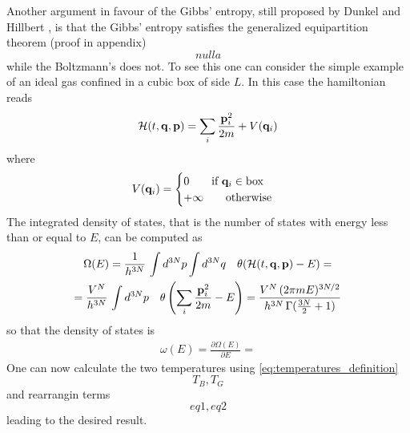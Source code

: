 Another argument in favour of the Gibbs' entropy, still proposed by Dunkel and Hillbert \cite{Dunkel_Hillbert}, is that the Gibbs' entropy satisfies the generalized equipartition theorem (proof in appendix)
\begin{equation}
    nulla
    \label{eq:equipartition}
\end{equation}
while the Boltzmann's does not. To see this one can consider the simple example of an ideal gas confined in a cubic box of side $L$. In this case the hamiltonian reads 
\begin{equation*}
    \mathcal{H}(t,\mathbf{q},\mathbf{p}) = \sum_i \frac{\mathbf{p}_i^2}{2m} + V(\mathbf{q}_i)
\end{equation*}
where 
\begin{equation*}
    V(\mathbf{q}_i) = 
    \begin{cases}
        0 \qquad \text{if } \mathbf{q}_i \in \text{box} \\
        +\infty \qquad \text{otherwise}
    \end{cases}
\end{equation*}
The integrated density of states, that is the number of states with energy less than or equal to $E$, can be computed as 
\begin{gather*}
    \Omega(E) = \frac{1}{h^{3N}} \, \int d^{3N}p \int d^{3N}q \quad \theta(\mathcal{H}(t, \mathbf{q}, \mathbf{p}) - E) = \\ = \frac{V^N}{h^{3N}} \, \int d^{3N}p \quad \theta\left(\sum_i \frac{\mathbf{p}_i^2}{2m}- E\right) 
    = \frac{V^N \, (2\pi mE)^{3N/2}}{h^{3N} \, \Gamma(\frac{3N}{2}+1)}
\end{gather*}
so that the density of states is 
\begin{gather*}
    \omega(E) = \frac{\partial \Omega(E)}{\partial E} = 
\end{gather*}
One can now calculate the two temperatures using \ref{eq:temperatures_definition}
\begin{equation*}
    T_B, T_G
\end{equation*}
and rearrangin terms 
\begin{equation}
    eq1, eq2
\end{equation}
leading to the desired result.